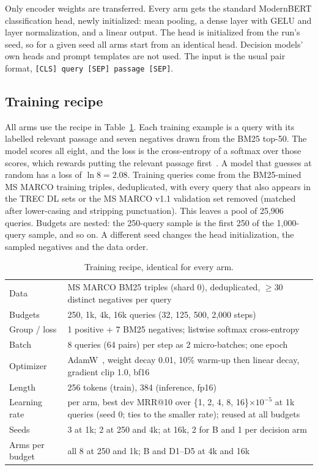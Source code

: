 \documentclass[journal]{IEEEtran}
\makeatletter
\newcommand{\ms}{MRR@10}
\makeatother
\begin{document}
Only encoder weights are transferred. Every arm gets the standard ModernBERT classification head, newly initialized: mean pooling, a dense layer with GELU and layer normalization, and a linear output. The head is initialized from the run's seed, so for a given seed all arms start from an identical head. Decision models' own heads and prompt templates are not used. The input is the usual pair format, \texttt{[CLS] query [SEP] passage [SEP]}.

\subsection{Training recipe}

All arms use the recipe in Table~\ref{tab:recipe}. Each training example is a query with its labelled relevant passage and seven negatives drawn from the BM25 top-50. The model scores all eight, and the loss is the cross-entropy of a softmax over those scores, which rewards putting the relevant passage first~\cite{gao2021rethink}. A model that guesses at random has a loss of $\ln 8=2.08$. Training queries come from the BM25-mined MS MARCO training triples, deduplicated, with every query that also appears in the TREC DL sets or the MS MARCO v1.1 validation set removed (matched after lower-casing and stripping punctuation). This leaves a pool of 25{,}906 queries. Budgets are nested: the 250-query sample is the first 250 of the 1{,}000-query sample, and so on. A different seed changes the head initialization, the sampled negatives and the data order.

\begin{table}[t]
\centering
\caption{Training recipe, identical for every arm.}
\label{tab:recipe}
\setlength{\tabcolsep}{4pt}
\begin{tabular}{@{}l p{5.1cm}@{}}
\toprule
Data & MS MARCO BM25 triples (shard 0), deduplicated, $\geq$30 distinct negatives per query \\
Budgets & 250, 1k, 4k, 16k queries (32, 125, 500, 2{,}000 steps) \\
Group / loss & 1 positive + 7 BM25 negatives; listwise softmax cross-entropy \\
Batch & 8 queries (64 pairs) per step as 2 micro-batches; one epoch \\
Optimizer & AdamW~\cite{loshchilov2019adamw}, weight decay 0.01, 10\% warm-up then linear decay, gradient clip 1.0, bf16 \\
Length & 256 tokens (train), 384 (inference, fp16) \\
Learning rate & per arm, best dev \ms{} over \{1, 2, 4, 8, 16\}$\times10^{-5}$ at 1k queries (seed 0; ties to the smaller rate); reused at all budgets \\
Seeds & 3 at 1k; 2 at 250 and 4k; at 16k, 2 for B and 1 per decision arm \\
Arms per budget & all 8 at 250 and 1k; B and D1--D5 at 4k and 16k \\
\bottomrule
\end{tabular}
\end{table}
\end{document}
